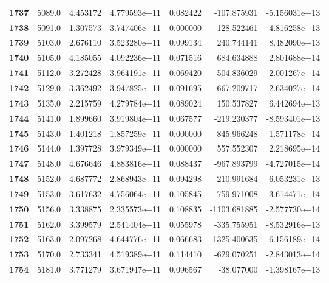 \documentclass{report}[12pt]
\begin{document}
\begin{center}
\begin{tabular}{lrrrrrr}
\textbf{1737} &         5089.0 &   4.453172 &  4.779593e+11 &    0.082422 &  -107.875931 & -5.156031e+13 \\
\textbf{1738} &         5091.0 &   1.307573 &  3.747406e+11 &    0.000000 &  -128.522461 & -4.816258e+13 \\
\textbf{1739} &         5103.0 &   2.676110 &  3.523280e+11 &    0.099134 &   240.744141 &  8.482090e+13 \\
\textbf{1740} &         5105.0 &   4.185055 &  4.092236e+11 &    0.071516 &   684.634888 &  2.801688e+14 \\
\textbf{1741} &         5112.0 &   3.272428 &  3.964191e+11 &    0.069420 &  -504.836029 & -2.001267e+14 \\
\textbf{1742} &         5129.0 &   3.362492 &  3.947825e+11 &    0.091695 &  -667.209717 & -2.634027e+14 \\
\textbf{1743} &         5135.0 &   2.215759 &  4.279784e+11 &    0.089024 &   150.537827 &  6.442694e+13 \\
\textbf{1744} &         5141.0 &   1.899660 &  3.919804e+11 &    0.067577 &  -219.230377 & -8.593401e+13 \\
\textbf{1745} &         5143.0 &   1.401218 &  1.857259e+11 &    0.000000 &  -845.966248 & -1.571178e+14 \\
\textbf{1746} &         5144.0 &   1.397728 &  3.979349e+11 &    0.000000 &   557.552307 &  2.218695e+14 \\
\textbf{1747} &         5148.0 &   4.676646 &  4.883816e+11 &    0.088437 &  -967.893799 & -4.727015e+14 \\
\textbf{1748} &         5152.0 &   4.687772 &  2.868943e+11 &    0.094298 &   210.991684 &  6.053231e+13 \\
\textbf{1749} &         5153.0 &   3.617632 &  4.756064e+11 &    0.105845 &  -759.971008 & -3.614471e+14 \\
\textbf{1750} &         5156.0 &   3.338875 &  2.335573e+11 &    0.108835 & -1103.681885 & -2.577730e+14 \\
\textbf{1751} &         5162.0 &   3.399579 &  2.541404e+11 &    0.055978 &  -335.755951 & -8.532916e+13 \\
\textbf{1752} &         5163.0 &   2.097268 &  4.644776e+11 &    0.066683 &  1325.400635 &  6.156189e+14 \\
\textbf{1753} &         5170.0 &   2.733341 &  4.519389e+11 &    0.114410 &  -629.070251 & -2.843013e+14 \\
\textbf{1754} &         5181.0 &   3.771279 &  3.671947e+11 &    0.096567 &   -38.077000 & -1.398167e+13 \\

\end{tabular}
\end{center}
\end{document}
